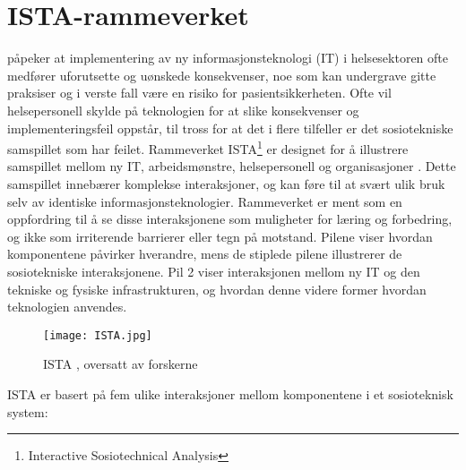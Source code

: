 \section{ISTA-rammeverket}
\label{section:ista-rammeverket}

\citet{Harrison07} påpeker at implementering av ny informasjonsteknologi (IT) i helsesektoren ofte medfører uforutsette og uønskede konsekvenser, noe som kan undergrave gitte praksiser og i verste fall være en risiko for pasientsikkerheten. Ofte vil helsepersonell skylde på teknologien for at slike konsekvenser og implementeringsfeil oppstår, til tross for at det i flere tilfeller er det sosiotekniske samspillet som har feilet. Rammeverket ISTA\footnote{Interactive Sosiotechnical Analysis} er designet for å illustrere samspillet mellom ny IT, arbeidsmønstre, helsepersonell og organisasjoner \citep{Harrison07}. Dette samspillet innebærer komplekse interaksjoner, og kan føre til at svært ulik bruk selv av identiske informasjonsteknologier. Rammeverket er ment som en oppfordring til å se disse interaksjonene som muligheter for læring og forbedring, og ikke som irriterende barrierer eller tegn på motstand. Pilene viser hvordan komponentene påvirker hverandre, mens de stiplede pilene illustrerer de sosiotekniske interaksjonene. Pil 2 viser interaksjonen mellom ny IT og den tekniske og fysiske infrastrukturen, og hvordan denne videre former hvordan teknologien anvendes.

\begin{figure}[H]
\centering
\texttt{[image: ISTA.jpg]}
\caption{ISTA \citep{Harrison}, oversatt av forskerne}
\label{fig:ISTA}
\end{figure}

\noindent
ISTA er basert på fem ulike interaksjoner mellom komponentene i et sosioteknisk system:  

